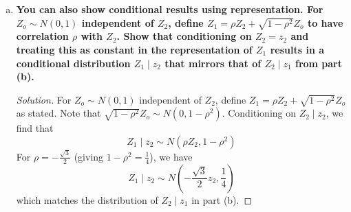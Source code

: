 \documentclass[11pt]{article}
\newenvironment{solution}
  {\renewcommand\qedsymbol{$\blacksquare$}\begin{proof}[Solution]}
  {\end{proof}}
\begin{document}
\begin{enumerate}
\begin{enumerate}[a)]
\begin{solution}
      We recognize the second term now as the pdf for $Z_2 \mid z_1 \sim N\left( -\frac{\sqrt{3}}{2}z_1, \frac{1}{4} \right)$, so we conclude
      \[
        f_{12}(z_1, z_2) = f_{Z_1}(z_1) f_{Z_2 \mid z_1}(z_2 \mid z_1).
      \] 
      Note that $\mathbb{E}\left[Z_2 \mid z_1 \right] = -\frac{\sqrt{3} }{2}z_1$, and 
      \begin{align*}
        \beta_0 + \beta_1 z_1 &= \left(\mu_2 - \left(\rho \frac{\sigma_2}{\sigma_1}\right)\mu_1\right) + \rho \frac{\sigma_2}{\sigma_1}z_1 \\
        &= (0 - 0) - \frac{\sqrt{3}}{2}z_1 \\
        &= -\frac{\sqrt{3} }{2} z_1.
      \end{align*}

      Similarly, $\mathrm{Var} \left[Z_2 \mid z_1 \right] = \frac{1}{4}$ and 
      \begin{align*}
        \left( 1 - \rho^2 \right) \sigma_2^2 &= \left( 1 - \left( -\frac{\sqrt{3}}{2} \right)^2\right) 1^2 \\
        &= \frac{1}{4},
      \end{align*}
      matching the results from the given formulas.
      \end{solution}

      \item \textbf{You can also show conditional results using representation. For $Z_o \sim N(0, 1)$ independent of $Z_2$, define $Z_1 = \rho Z_2 + \sqrt{1-\rho^2}Z_o$ to have correlation $\rho$ with $Z_2$.
      Show that conditioning on $Z_2 = z_2$ and treating this as constant in the representation of $Z_1$ results in a conditional distribution $Z_1 \mid z_2$ that mirrors that of $Z_2 \mid z_1$ from part (b).}
    
      \begin{solution}
        For $Z_o \sim N(0, 1)$ independent of $Z_2$, define $Z_1 = \rho Z_2 + \sqrt{1-\rho^2}Z_o$ as stated. Note that $\sqrt{1-\rho^2}Z_o \sim N(0, 1-\rho^2)$. Conditioning on $Z_2 \mid z_2$, we find that
        \[
          Z_1 \mid z_2 \sim N(\rho Z_2, 1-\rho^2)
        \] 
        For $\rho = -\frac{\sqrt{3} }{2}$ (giving $1-\rho^2 = \frac{1}{4}$), we have
        \[
          Z_1 \mid z_2 \sim N\left( -\frac{\sqrt{3} }{2}z_2, \frac{1}{4} \right) 
        \]
        which matches the distribution of $Z_2 \mid z_1$ in part (b).
      \end{solution}
    \end{enumerate}

    \newpage
    

\end{enumerate}
\end{document}
